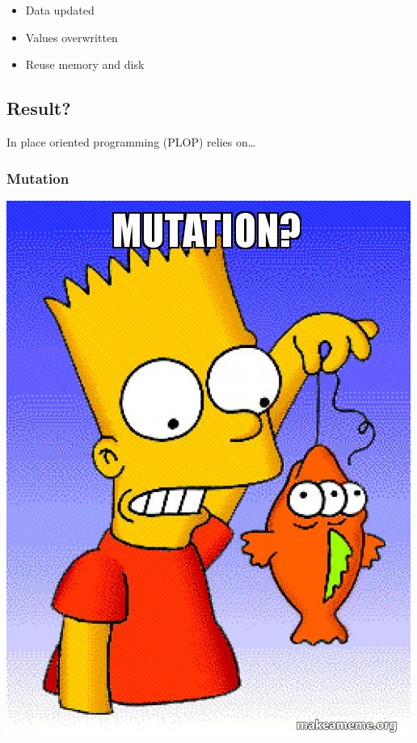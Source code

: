 \documentclass[11pt]{article}
\begin{document}
\begin{itemize}
\item Data updated
\end{itemize}
\begin{itemize}
\item Values overwritten
\end{itemize}
\begin{itemize}
\item Reuse memory and disk
\end{itemize}

\subsection*{Result?}
\label{sec:orgheadline16}

In place oriented programming (PLOP) relies on\ldots{}

\subsubsection*{Mutation}
\label{sec:orgheadline12}

\includegraphics[width=.9\linewidth]{./mutation.jpg}
\end{document}
